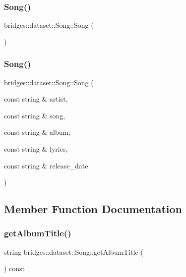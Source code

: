 \subsubsection{\texorpdfstring{Song()}{Song()}\hspace{0.1cm}{\footnotesize\ttfamily [1/2]}}
{\footnotesize\ttfamily bridges\+::dataset\+::\+Song\+::\+Song (\begin{DoxyParamCaption}{ }\end{DoxyParamCaption})\hspace{0.3cm}{\ttfamily [inline]}}

\mbox{\label{classbridges_1_1dataset_1_1_song_a0938ada0b5596c874aa9254f1bde1275}} 
\subsubsection{\texorpdfstring{Song()}{Song()}\hspace{0.1cm}{\footnotesize\ttfamily [2/2]}}
{\footnotesize\ttfamily bridges\+::dataset\+::\+Song\+::\+Song (\begin{DoxyParamCaption}\item[{const string \&}]{artist,  }\item[{const string \&}]{song,  }\item[{const string \&}]{album,  }\item[{const string \&}]{lyrics,  }\item[{const string \&}]{release\+\_\+date }\end{DoxyParamCaption})\hspace{0.3cm}{\ttfamily [inline]}}



\subsection{Member Function Documentation}
\mbox{\label{classbridges_1_1dataset_1_1_song_a0bc005c3522a1ac6c36bbf721014cb07}} 
\subsubsection{\texorpdfstring{getAlbumTitle()}{getAlbumTitle()}}
{\footnotesize\ttfamily string bridges\+::dataset\+::\+Song\+::get\+Album\+Title (\begin{DoxyParamCaption}{ }\end{DoxyParamCaption}) const\hspace{0.3cm}{\ttfamily [inline]}}

